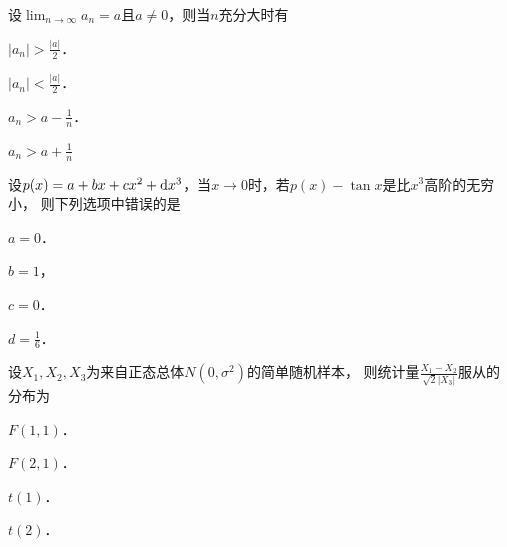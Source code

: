 \documentclass[plain,noanswer,medmath]{../../template/jnuexam}
\begin{document}






\begin{problem}
设$\lim_{n \to \infty} a_n = a$且$a \ne 0$，则当$n$充分大时有\pickout{}
\begin{abcd}
\item $|a_n| > \frac{|a|}{2}$．
\item $|a_n| < \frac{|a|}{2}$．
\item $a_n > a - \frac{1}{n}$．
\item $a_n > a + \frac{1}{n}$
\end{abcd}
\end{problem}




\begin{problem}
设$p(x) = a + bx + cx^2 + \mathop{}\!\mathrm{d} x^3$，当$x \to 0$时，若$p(x) - \tan x$是比$x^3$高阶的无穷小，
则下列选项中错误的是\pickout{}
\begin{abcd}
\item $a = 0$．
\item $b = 1$，
\item $c = 0$．
\item $d = \frac{1}{6}$．
\end{abcd}
\end{problem}










\begin{problem}
设$X_1,X_2,X_3$为来自正态总体$N(0,\sigma^2)$的简单随机样本，
则统计量$\frac{X_1 - X_2}{\sqrt{2}|X_3|}$服从的分布为\pickout{}
\begin{abcd}
\item $F(1,1)$．
\item $F(2,1)$．
\item $t(1)$．
\item $t(2)$．
\end{abcd}
\end{problem}


\end{document}
